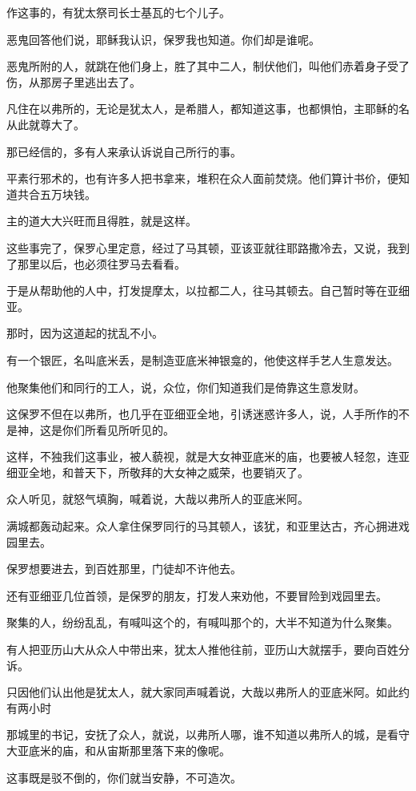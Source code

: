 \documentclass[12pt,oneside]{book}
\begin{document}
作这事的，有犹太祭司长士基瓦的七个儿子。

恶鬼回答他们说，耶稣我认识，保罗我也知道。你们却是谁呢。

恶鬼所附的人，就跳在他们身上，胜了其中二人，制伏他们，叫他们赤着身子受了伤，从那房子里逃出去了。

凡住在以弗所的，无论是犹太人，是希腊人，都知道这事，也都惧怕，主耶稣的名从此就尊大了。

那已经信的，多有人来承认诉说自己所行的事。

平素行邪术的，也有许多人把书拿来，堆积在众人面前焚烧。他们算计书价，便知道共合五万块钱。

主的道大大兴旺而且得胜，就是这样。

这些事完了，保罗心里定意，经过了马其顿，亚该亚就往耶路撒冷去，又说，我到了那里以后，也必须往罗马去看看。

于是从帮助他的人中，打发提摩太，以拉都二人，往马其顿去。自己暂时等在亚细亚。

那时，因为这道起的扰乱不小。

有一个银匠，名叫底米丢，是制造亚底米神银龛的，他使这样手艺人生意发达。

他聚集他们和同行的工人，说，众位，你们知道我们是倚靠这生意发财。

这保罗不但在以弗所，也几乎在亚细亚全地，引诱迷惑许多人，说，人手所作的不是神，这是你们所看见所听见的。

这样，不独我们这事业，被人藐视，就是大女神亚底米的庙，也要被人轻忽，连亚细亚全地，和普天下，所敬拜的大女神之威荣，也要销灭了。

众人听见，就怒气填胸，喊着说，大哉以弗所人的亚底米阿。

满城都轰动起来。众人拿住保罗同行的马其顿人，该犹，和亚里达古，齐心拥进戏园里去。

保罗想要进去，到百姓那里，门徒却不许他去。

还有亚细亚几位首领，是保罗的朋友，打发人来劝他，不要冒险到戏园里去。

聚集的人，纷纷乱乱，有喊叫这个的，有喊叫那个的，大半不知道为什么聚集。

有人把亚历山大从众人中带出来，犹太人推他往前，亚历山大就摆手，要向百姓分诉。

只因他们认出他是犹太人，就大家同声喊着说，大哉以弗所人的亚底米阿。如此约有两小时

那城里的书记，安抚了众人，就说，以弗所人哪，谁不知道以弗所人的城，是看守大亚底米的庙，和从宙斯那里落下来的像呢。

这事既是驳不倒的，你们就当安静，不可造次。
\end{document}
